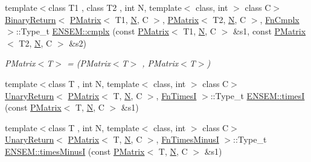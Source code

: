 \begin{DoxyCompactItemize}
{\footnotesize template$<$class T1 , class T2 , int N, template$<$ class, int $>$ class C$>$ }\\\mbox{\hyperlink{structENSEM_1_1BinaryReturn}{Binary\+Return}}$<$ \mbox{\hyperlink{classENSEM_1_1PMatrix}{P\+Matrix}}$<$ T1, \mbox{\hyperlink{operator__name__util_8cc_a7722c8ecbb62d99aee7ce68b1752f337}{N}}, C $>$, \mbox{\hyperlink{classENSEM_1_1PMatrix}{P\+Matrix}}$<$ T2, \mbox{\hyperlink{operator__name__util_8cc_a7722c8ecbb62d99aee7ce68b1752f337}{N}}, C $>$, \mbox{\hyperlink{structENSEM_1_1FnCmplx}{Fn\+Cmplx}} $>$\+::Type\+\_\+t \mbox{\hyperlink{group__primmatrix_ga895c61e14c8d4206a949f44e36add5c6}{E\+N\+S\+E\+M\+::cmplx}} (const \mbox{\hyperlink{classENSEM_1_1PMatrix}{P\+Matrix}}$<$ T1, \mbox{\hyperlink{operator__name__util_8cc_a7722c8ecbb62d99aee7ce68b1752f337}{N}}, C $>$ \&s1, const \mbox{\hyperlink{classENSEM_1_1PMatrix}{P\+Matrix}}$<$ T2, \mbox{\hyperlink{operator__name__util_8cc_a7722c8ecbb62d99aee7ce68b1752f337}{N}}, C $>$ \&s2)
\begin{DoxyCompactList}\small\item\em P\+Matrix$<$\+T$>$ = (P\+Matrix$<$\+T$>$ , P\+Matrix$<$\+T$>$) \end{DoxyCompactList}\item 
{\footnotesize template$<$class T , int N, template$<$ class, int $>$ class C$>$ }\\\mbox{\hyperlink{structENSEM_1_1UnaryReturn}{Unary\+Return}}$<$ \mbox{\hyperlink{classENSEM_1_1PMatrix}{P\+Matrix}}$<$ T, \mbox{\hyperlink{operator__name__util_8cc_a7722c8ecbb62d99aee7ce68b1752f337}{N}}, C $>$, \mbox{\hyperlink{structENSEM_1_1FnTimesI}{Fn\+TimesI}} $>$\+::Type\+\_\+t \mbox{\hyperlink{group__primmatrix_ga9f1d3892badcfa2bf78d97c42c8a05e5}{E\+N\+S\+E\+M\+::timesI}} (const \mbox{\hyperlink{classENSEM_1_1PMatrix}{P\+Matrix}}$<$ T, \mbox{\hyperlink{operator__name__util_8cc_a7722c8ecbb62d99aee7ce68b1752f337}{N}}, C $>$ \&s1)
\item 
{\footnotesize template$<$class T , int N, template$<$ class, int $>$ class C$>$ }\\\mbox{\hyperlink{structENSEM_1_1UnaryReturn}{Unary\+Return}}$<$ \mbox{\hyperlink{classENSEM_1_1PMatrix}{P\+Matrix}}$<$ T, \mbox{\hyperlink{operator__name__util_8cc_a7722c8ecbb62d99aee7ce68b1752f337}{N}}, C $>$, \mbox{\hyperlink{structENSEM_1_1FnTimesMinusI}{Fn\+Times\+MinusI}} $>$\+::Type\+\_\+t \mbox{\hyperlink{group__primmatrix_ga937a4152dd7d0ceaec303ddbdbaf5a98}{E\+N\+S\+E\+M\+::times\+MinusI}} (const \mbox{\hyperlink{classENSEM_1_1PMatrix}{P\+Matrix}}$<$ T, \mbox{\hyperlink{operator__name__util_8cc_a7722c8ecbb62d99aee7ce68b1752f337}{N}}, C $>$ \&s1)

\end{DoxyCompactItemize}
